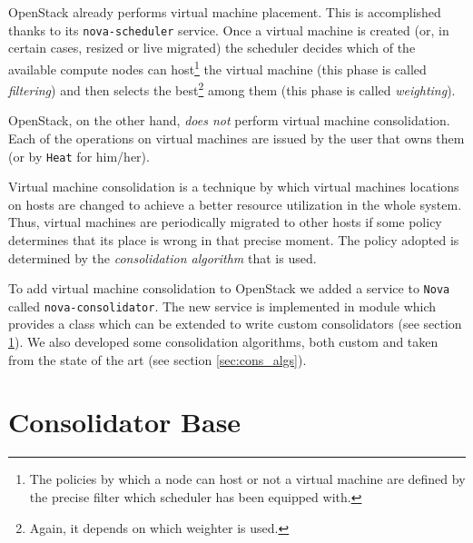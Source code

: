 
OpenStack already performs virtual machine placement. This is accomplished thanks to its \texttt{nova-scheduler} service. Once a virtual machine is created (or, in certain cases, resized or live migrated) the scheduler decides which of the available compute nodes can host\footnote{The policies by which a node can host or not a virtual machine are defined by the precise filter which scheduler has been equipped with.} the virtual machine (this phase is called \textit{filtering}) and then selects the best\footnote{Again, it depends on which weighter is used.} among them (this phase is called \textit{weighting}).

OpenStack, on the other hand, \emph{does not} perform virtual machine consolidation. Each of the operations on virtual machines are issued by the user that owns them (or by \texttt{Heat} for him/her).

Virtual machine consolidation is a technique by which virtual machines locations on hosts are changed to achieve a better resource utilization in the whole system. Thus, virtual machines are periodically migrated to other hosts if some policy determines that its place is wrong in that precise moment. The policy adopted is determined by the \emph{consolidation algorithm} that is used.

To add virtual machine consolidation to OpenStack we added a service to \texttt{Nova} called \texttt{nova-consolidator}. The new service is implemented in module  which provides a  class which can be extended to write custom consolidators (see section \ref{sec:cons_base}). We also developed some consolidation algorithms, both custom and taken from the state of the art (see section \ref{sec:cons_algs}).

\section{Consolidator Base}
\label{sec:cons_base}

